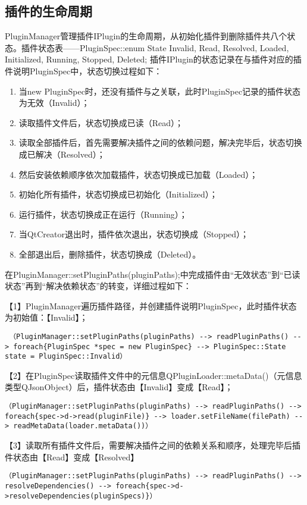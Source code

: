\subsection{插件的生命周期}
PluginManager管理插件IPlugin的生命周期，从初始化插件到删除插件共八个状态。插件状态表——PluginSpec::enum State { Invalid, Read, Resolved, Loaded, Initialized, Running, Stopped, Deleted};
插件IPlugin的状态记录在与插件对应的插件说明PluginSpec中，状态切换过程如下：
\begin{enumerate}
    \item 当new PluginSpec时，还没有插件与之关联，此时PluginSpec记录的插件状态为无效（Invalid）；
    \item 读取插件文件后，状态切换成已读（Read）；
    \item 读取全部插件后，首先需要解决插件之间的依赖问题，解决完毕后，状态切换成已解决（Resolved）；
    \item 然后安装依赖顺序依次加载插件，状态切换成已加载（Loaded）；
    \item 初始化所有插件，状态切换成已初始化（Initialized）；
    \item 运行插件，状态切换成正在运行（Running）；
    \item 当QtCreator退出时，插件依次退出，状态切换成（Stopped）；
    \item 全部退出后，删除插件，状态切换成（Deleted）。
\end{enumerate}

在PluginManager::setPluginPaths(pluginPaths);中完成插件由“无效状态”到“已读状态”再到“解决依赖状态”的转变，详细过程如下：

【1】PluginManager遍历插件路径，并创建插件说明PluginSpec，此时插件状态为初始值：【Invalid】；
\begin{lstlisting}
 （PluginManager::setPluginPaths(pluginPaths) --> readPluginPaths() --> foreach{PluginSpec *spec = new PluginSpec} --> PluginSpec::State state = PluginSpec::Invalid）   
\end{lstlisting}


【2】在PluginSpec读取插件文件中的元信息QPluginLoader::metaData()（元信息类型QJsonObject）后，插件状态由【Invalid】变成【Read】；
\begin{lstlisting}
（PluginManager::setPluginPaths(pluginPaths) --> readPluginPaths() --> foreach{spec->d->read(pluginFile)} --> loader.setFileName(filePath) --> readMetaData(loader.metaData())）    
\end{lstlisting}


【3】读取所有插件文件后，需要解决插件之间的依赖关系和顺序，处理完毕后插件状态由【Read】变成【Resolved】
\begin{lstlisting}
（PluginManager::setPluginPaths(pluginPaths) --> readPluginPaths() --> resolveDependencies() --> foreach{spec->d->resolveDependencies(pluginSpecs)}）  
\end{lstlisting}

